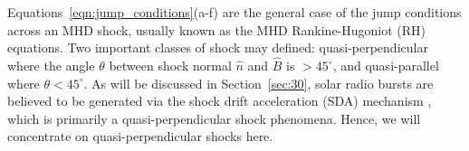 Equations~\ref{eqn:jump_conditions}(a-f) are the general case of the jump conditions across an MHD shock, usually known as the MHD Rankine-Hugoniot (RH) equations. Two important classes of shock may defined: quasi-perpendicular where the angle $\theta$ between shock normal $\hat{n}$ and $\hat{B}$ is $>45^{\circ}$, and quasi-parallel where $\theta<45^{\circ}$. 
{\color{blue}As will be discussed in Section~\ref{sec:30}, solar radio bursts are believed to be generated via the shock drift acceleration (SDA) mechanism \citep{holman1983}, which is primarily a quasi-perpendicular shock phenomena. Hence, we will concentrate on quasi-perpendicular shocks here.}

